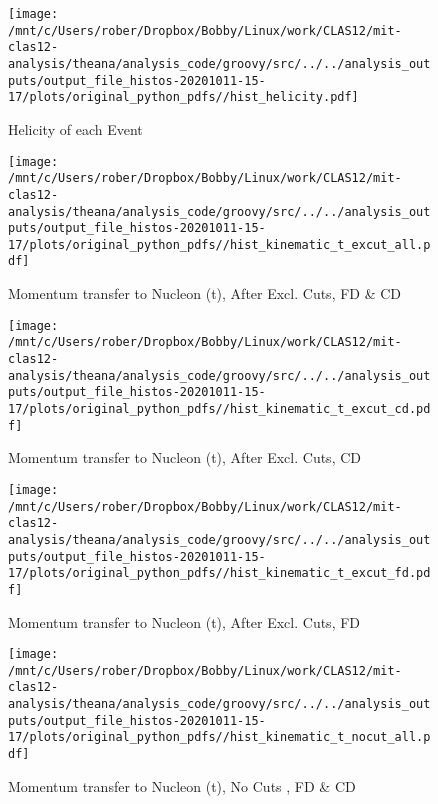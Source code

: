 \documentclass{article}
\begin{document}
\begin{landscape}
    \begin{figure}[h]
        \centering

        \texttt{[image: /mnt/c/Users/rober/Dropbox/Bobby/Linux/work/CLAS12/mit-clas12-analysis/theana/analysis\_code/groovy/src/../../analysis\_outputs/output\_file\_histos-20201011-15-17/plots/original\_python\_pdfs//hist\_helicity.pdf]}
        \captionsetup{textformat=empty,labelformat=blank}
        \caption{Helicity of each Event}
    \end{figure}
    \clearpage
    
    \begin{figure}[h]
        \centering

        \texttt{[image: /mnt/c/Users/rober/Dropbox/Bobby/Linux/work/CLAS12/mit-clas12-analysis/theana/analysis\_code/groovy/src/../../analysis\_outputs/output\_file\_histos-20201011-15-17/plots/original\_python\_pdfs//hist\_kinematic\_t\_excut\_all.pdf]}
        \captionsetup{textformat=empty,labelformat=blank}
        \caption{Momentum transfer to Nucleon (t), After Excl. Cuts, FD \& CD}
    \end{figure}
    \clearpage
    
    \begin{figure}[h]
        \centering

        \texttt{[image: /mnt/c/Users/rober/Dropbox/Bobby/Linux/work/CLAS12/mit-clas12-analysis/theana/analysis\_code/groovy/src/../../analysis\_outputs/output\_file\_histos-20201011-15-17/plots/original\_python\_pdfs//hist\_kinematic\_t\_excut\_cd.pdf]}
        \captionsetup{textformat=empty,labelformat=blank}
        \caption{Momentum transfer to Nucleon (t), After Excl. Cuts, CD}
    \end{figure}
    \clearpage
    
    \begin{figure}[h]
        \centering

        \texttt{[image: /mnt/c/Users/rober/Dropbox/Bobby/Linux/work/CLAS12/mit-clas12-analysis/theana/analysis\_code/groovy/src/../../analysis\_outputs/output\_file\_histos-20201011-15-17/plots/original\_python\_pdfs//hist\_kinematic\_t\_excut\_fd.pdf]}
        \captionsetup{textformat=empty,labelformat=blank}
        \caption{Momentum transfer to Nucleon (t), After Excl. Cuts, FD}
    \end{figure}
    \clearpage
    
    \begin{figure}[h]
        \centering

        \texttt{[image: /mnt/c/Users/rober/Dropbox/Bobby/Linux/work/CLAS12/mit-clas12-analysis/theana/analysis\_code/groovy/src/../../analysis\_outputs/output\_file\_histos-20201011-15-17/plots/original\_python\_pdfs//hist\_kinematic\_t\_nocut\_all.pdf]}
        \captionsetup{textformat=empty,labelformat=blank}
        \caption{Momentum transfer to Nucleon (t), No Cuts , FD \& CD}
    \end{figure}
    \clearpage
    

\end{landscape}
\end{document}
